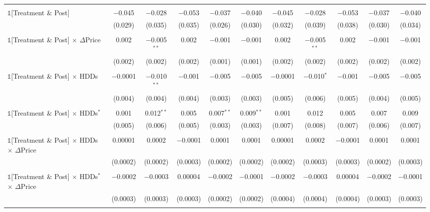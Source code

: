 \begin{table}[!htbp]
\begin{longtable}{@{\extracolsep{0pt}}lcccccccccc}
  & & & & & & & & & & \\ 
 $\mathbb{1}$[Treatment \& Post] & $-$0.045 & $-$0.028 & $-$0.053 & $-$0.037 & $-$0.040 & $-$0.045 & $-$0.028 & $-$0.053 & $-$0.037 & $-$0.040 \\ 
  & (0.029) & (0.035) & (0.035) & (0.026) & (0.030) & (0.032) & (0.039) & (0.038) & (0.030) & (0.034) \\ 
  & & & & & & & & & & \\ 
 $\mathbb{1}$[Treatment \& Post] $\times$ $\Delta$Price & 0.002 & $-$0.005$^{**}$ & 0.002 & $-$0.001 & $-$0.001 & 0.002 & $-$0.005$^{**}$ & 0.002 & $-$0.001 & $-$0.001 \\ 
  & (0.002) & (0.002) & (0.002) & (0.001) & (0.001) & (0.002) & (0.002) & (0.002) & (0.002) & (0.002) \\ 
  & & & & & & & & & & \\ 
 $\mathbb{1}$[Treatment \& Post] $\times$ HDDs & $-$0.0001 & $-$0.010$^{**}$ & $-$0.001 & $-$0.005 & $-$0.005 & $-$0.0001 & $-$0.010$^{*}$ & $-$0.001 & $-$0.005 & $-$0.005 \\ 
  & (0.004) & (0.004) & (0.004) & (0.003) & (0.003) & (0.005) & (0.006) & (0.005) & (0.004) & (0.005) \\ 
  & & & & & & & & & & \\ 
 $\mathbb{1}$[Treatment \& Post] $\times$ HDDs$^{*}$ & 0.001 & 0.012$^{**}$ & 0.005 & 0.007$^{**}$ & 0.009$^{**}$ & 0.001 & 0.012 & 0.005 & 0.007 & 0.009 \\ 
  & (0.005) & (0.006) & (0.005) & (0.003) & (0.003) & (0.007) & (0.008) & (0.007) & (0.006) & (0.007) \\ 
  & & & & & & & & & & \\ 
 $\mathbb{1}$[Treatment \& Post] $\times$ HDDs $\times$ $\Delta$Price & 0.00001 & 0.0002 & $-$0.0001 & 0.0001 & 0.0001 & 0.00001 & 0.0002 & $-$0.0001 & 0.0001 & 0.0001 \\ 
  & (0.0002) & (0.0002) & (0.0003) & (0.0002) & (0.0002) & (0.0002) & (0.0003) & (0.0003) & (0.0002) & (0.0003) \\ 
  & & & & & & & & & & \\ 
 $\mathbb{1}$[Treatment \& Post] $\times$ HDDs$^{*}$ $\times$ $\Delta$Price & $-$0.0002 & $-$0.0003 & 0.00004 & $-$0.0002 & $-$0.0001 & $-$0.0002 & $-$0.0003 & 0.00004 & $-$0.0002 & $-$0.0001 \\ 
  & (0.0003) & (0.0003) & (0.0003) & (0.0002) & (0.0002) & (0.0004) & (0.0004) & (0.0004) & (0.0003) & (0.0003) \\ 
  & & & & & & & & & & \\ 

\end{longtable}
\end{table}
